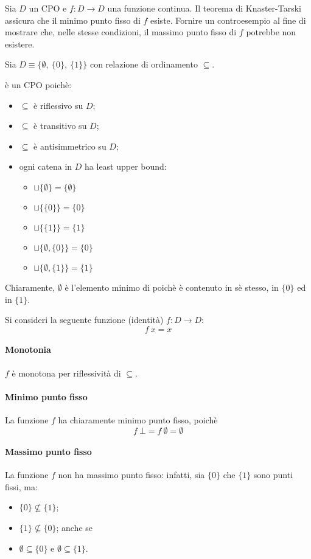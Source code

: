 \newcommand{\lt}{\ensuremath{\sqsubseteq}}

{
  Sia $D$ un CPO e $f: D \to D$ una funzione continua. Il teorema di
  Knaster-Tarski assicura che il minimo punto fisso di $f$ esiste.
  Fornire un controesempio al fine di mostrare che, nelle stesse condizioni, il
  massimo punto fisso di $f$ potrebbe non esistere.
}
{
}

Sia $D \equiv \{\emptyset,\ \{0\},\ \{1\}\}$ con relazione di ordinamento
$\subseteq$.

 è un CPO poichè:
\begin{itemize}
  \item $\subseteq$ è riflessivo su $D$;
  \item $\subseteq$ è transitivo su $D$;
  \item $\subseteq$ è antisimmetrico su $D$;
  \item ogni catena in $D$ ha least upper bound:
  \begin{itemize}
    \item $\sqcup\{\emptyset\} = \{\emptyset\}$
    \item $\sqcup\{\{0\}\} = \{0\}$
    \item $\sqcup\{\{1\}\} = \{1\}$
    \item $\sqcup\{\emptyset, \{0\}\} = \{0\}$
    \item $\sqcup\{\emptyset, \{1\}\} = \{1\}$
  \end{itemize}
\end{itemize}

Chiaramente, $\emptyset$ è l'elemento minimo di  poichè
è contenuto in sè stesso, in $\{0\}$ ed in $\{1\}$.

Si consideri la seguente funzione (identità) $f: D \to D$:
$$
f\ x = x
$$

\paragraph{Monotonia} $f$ è monotona per riflessività di $\subseteq$.

\paragraph{Minimo punto fisso}
La funzione $f$ ha chiaramente minimo punto fisso, poichè
$$
f\ \bot = f\ \emptyset = \emptyset
$$

\paragraph{Massimo punto fisso}
La funzione $f$ non ha massimo punto fisso: infatti, sia $\{0\}$ che $\{1\}$
sono punti fissi, ma:
\begin{itemize}
  \item $\{0\} \not\subseteq \{1\}$;
  \item $\{1\} \not\subseteq \{0\}$; anche se
  \item $\emptyset \subseteq \{0\}$ e $\emptyset \subseteq \{1\}$.
\end{itemize}

\let\lt\undefined
